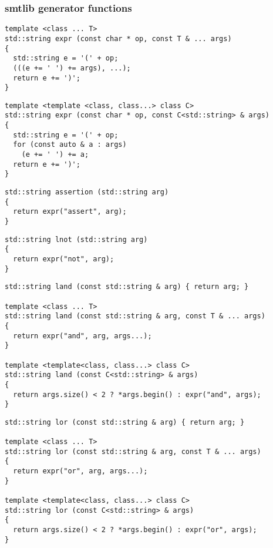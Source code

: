
\subsubsection{smtlib generator functions}

\begin{lstlisting}[style=c++]
template <class ... T>
std::string expr (const char * op, const T & ... args)
{
  std::string e = '(' + op;
  (((e += ' ') += args), ...);
  return e += ')';
}
\end{lstlisting}

\begin{lstlisting}[style=c++]
template <template <class, class...> class C>
std::string expr (const char * op, const C<std::string> & args)
{
  std::string e = '(' + op;
  for (const auto & a : args)
    (e += ' ') += a;
  return e += ')';
}
\end{lstlisting}

\begin{lstlisting}[style=c++]
std::string assertion (std::string arg)
{
  return expr("assert", arg);
}
\end{lstlisting}

\begin{lstlisting}[style=c++]
std::string lnot (std::string arg)
{
  return expr("not", arg);
}
\end{lstlisting}

\begin{lstlisting}[style=c++]
std::string land (const std::string & arg) { return arg; }

template <class ... T>
std::string land (const std::string & arg, const T & ... args)
{
  return expr("and", arg, args...);
}

template <template<class, class...> class C>
std::string land (const C<std::string> & args)
{
  return args.size() < 2 ? *args.begin() : expr("and", args);
}
\end{lstlisting}

\begin{lstlisting}[style=c++]
std::string lor (const std::string & arg) { return arg; }

template <class ... T>
std::string lor (const std::string & arg, const T & ... args)
{
  return expr("or", arg, args...);
}

template <template<class, class...> class C>
std::string lor (const C<std::string> & args)
{
  return args.size() < 2 ? *args.begin() : expr("or", args);
}
\end{lstlisting}

